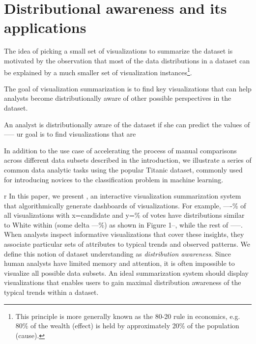 \section{Distributional awareness and its applications\label{sec:distributionaware}}
The idea of picking a small set of visualizations to summarize the dataset is motivated by the observation that most of the data distributions in a dataset can be explained by a much smaller set of visualization instances\footnote{This principle is more generally known as the 80-20 rule in economics, e.g. 80\% of the wealth (effect) is held by approximately 20\% of the population (cause).}. 

The goal of visualization summarization is to find key visualizations that can help analysts become distributionally aware of other possible perspectives in the dataset.


An analyst is distributionally aware of the dataset if she can predict the values of -----
ur goal is to find visualizations that are 

In addition to the use case of accelerating the process of manual comparisons across different data subsets described in the introduction, we illustrate a series of common data analytic tasks using the popular Titanic dataset, commonly used for introducing novices to the classification problem in machine learning\cite{titanic}.

r In this paper, we present \system, an interactive visualization summarization system that algorithmically generate dashboards of visualizations.  For example, ----\% of all visualizations with x=candidate and y=\% of votes have distributions similar to White within (some delta ---\%) as shown in Figure 1--, while the rest of -----. When analysts inspect informative visualizations that cover these insights, they associate particular sets of attributes to typical trends and observed patterns. We define this notion of dataset understanding as \emph{distribution awareness}. Since human analysts have limited memory and attention, it is often impossible to visualize all possible data subsets. An ideal summarization system should display visualizations that enables users to gain maximal distribution awareness of the typical trends within a dataset. 

  


